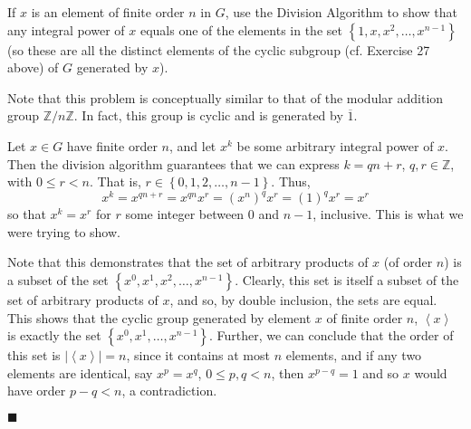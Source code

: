 \documentclass[12pt]{article}
\renewcommand{\qed}{\hfill$\blacksquare$}
\renewenvironment{proof}{\begin{addmargin}[1em]{0em}\begin{newproof}}{\end{newproof}\end{addmargin}\qed}
\newenvironment{problem}[2][Exercise]{\begin{trivlist}
\item[\hskip \labelsep {\bfseries #1}\hskip \labelsep {\bfseries #2.}]}{\end{trivlist}}
\begin{document}
\begin{problem}{1.1.35}
If $x$ is an element of finite order $n$ in $G$, use the Division Algorithm to show that any integral power of $x$ equals one of the elements in the set $\left\{1,x,x^2,\ldots,x^{n-1}\right\}$ (so these are all the distinct elements of the cyclic subgroup (cf. Exercise 27 above) of $G$ generated by $x$).
\end{problem}
{\color{red}Note that this problem is conceptually similar to that of the modular addition group $\mathbb{Z}/n\mathbb{Z}$. In fact, this group is cyclic and is generated by $\overline{1}$.}\\
\begin{proof}
Let $x\in G$ have finite order $n$, and let $x^k$ be some arbitrary integral power of $x$. Then the division algorithm guarantees that we can express $k = qn + r$, $q,r\in \mathbb{Z}$, with $0\leq r < n$. That is, $r\in\left\{0,1,2,\ldots,n-1\right\}$. Thus,
$$ x^k = x^{qn+r} = x^{qn}x^r = \left(x^n\right)^q x^r = \left(1\right)^q x^r = x^r $$ so that $x^k = x^r$ for $r$ some integer between $0$ and $n-1$, inclusive. This is what we were trying to show.

Note that this demonstrates that the set of arbitrary products of $x$ (of order $n$) is a subset of the set $\left\{x^0,x^1,x^2,\ldots,x^{n-1}\right\}$. Clearly, this set is itself a subset of the set of arbitrary products of $x$, and so, by double inclusion, the sets are equal. This shows that the cyclic group generated by element $x$ of finite order $n$, $\left\langle x \right\rangle$ is exactly the set $\left\{x^0,x^1,\ldots,x^{n-1}\right\}$. Further, we can conclude that the order of this set is $\left| \left\langle x\right\rangle \right|=n$, since it contains at most $n$ elements, and if any two elements are identical, say $x^p=x^q$, $0\leq p,q < n$, then $x^{p-q} = 1$ and so $x$ would have order $p-q < n$, a contradiction.

\end{proof}
\end{document}

